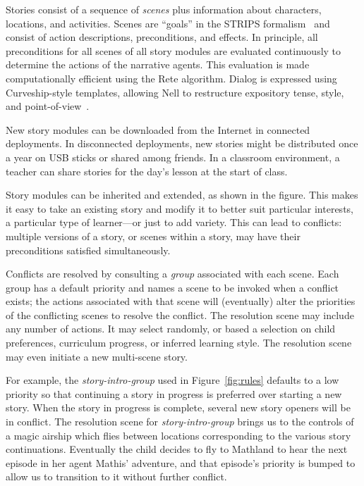 \documentclass[preprint]{sig-alternate}
\begin{document}
Stories consist of a sequence of \textit{scenes} plus information about
characters, locations, and activities.  Scenes are ``goals''
in the STRIPS formalism~\cite{strips} and consist of
action descriptions, preconditions, and effects.
In principle, all preconditions for all scenes of all story modules
are evaluated continuously to determine the actions of the narrative
agents.  This evaluation
is made computationally efficient using the Rete
algorithm.  Dialog is expressed using Curveship-style
templates, allowing Nell to restructure
expository tense, style, and point-of-view~\cite{montfort:curveship}.


New story modules can be downloaded from the Internet in
connected deployments.  In disconnected deployments, new stories
might be distributed once a year on USB sticks or shared among
friends.  In a classroom environment, a teacher can share stories for
the day's lesson at the start of class.

Story modules can be inherited and extended, as shown in the figure.
This makes it easy to take an existing story and modify it to
better suit particular interests, a particular type of learner---or
just to add variety.  This can lead to conflicts: multiple versions of
a story, or scenes within a story, may have their
preconditions satisfied simultaneously.

Conflicts are resolved by consulting a \textit{group} associated with
each scene.  Each group has a default priority and names a scene to be
invoked when a conflict exists; the actions associated with that scene
will (eventually) alter the priorities of the conflicting scenes to
resolve the conflict.  The resolution scene may include any number of
actions.  It may select randomly, or based a selection on
child preferences, curriculum progress, or inferred learning style.
The resolution scene may even initiate a new multi-scene story.

For example, the \textit{story-intro-group}
used in Figure~\ref{fig:rules} defaults to a low priority so that
continuing a story in progress is preferred over starting a new story.
When the story in progress is complete, several new story openers will be in
conflict.  The resolution scene for \textit{story-intro-group} brings us
to the controls of a magic airship which flies between locations
corresponding to the various story continuations.  Eventually the
child decides to fly to Mathland to hear the next episode in her
agent Mathis' adventure, and that episode's priority is bumped to
allow us to transition to it without further conflict.
\end{document}

